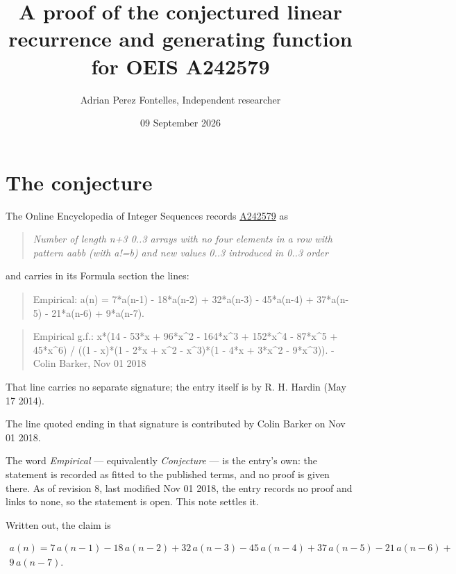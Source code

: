 \documentclass[11pt]{article}
\title{A proof of the conjectured linear recurrence and generating function for OEIS A242579}
\author{Adrian Perez Fontelles, Independent researcher}
\date{09 September 2026}
\theoremstyle{definition}
\begin{document}
\maketitle
\section{The conjecture}

The Online Encyclopedia of Integer Sequences records \href{https://oeis.org/A242579}{A242579} as

\begin{quote}\itshape Number of length n+3 0..3 arrays with no four elements in a row with pattern aabb (with a!=b) and new values 0..3 introduced in 0..3 order\end{quote}

and carries in its Formula section the lines:

\begin{quote}\ttfamily Empirical: a(n) = 7*a(n-1) - 18*a(n-2) + 32*a(n-3) - 45*a(n-4) + 37*a(n-5) - 21*a(n-6) + 9*a(n-7).\end{quote}

\begin{quote}\ttfamily Empirical g.f.: x*(14 - 53*x + 96*x\textasciicircum{}2 - 164*x\textasciicircum{}3 + 152*x\textasciicircum{}4 - 87*x\textasciicircum{}5 + 45*x\textasciicircum{}6) / ((1 - x)*(1 - 2*x + x\textasciicircum{}2 - x\textasciicircum{}3)*(1 - 4*x + 3*x\textasciicircum{}2 - 9*x\textasciicircum{}3)). - Colin Barker, Nov 01 2018\end{quote}

That line carries no separate signature; the entry itself is by R. H. Hardin (May 17 2014).

The line quoted ending in that signature is contributed by Colin Barker on Nov 01 2018.

The word {\itshape Empirical} --- equivalently {\itshape Conjecture} --- is the entry's own: the statement is recorded as fitted to the published terms, and no proof is given there. As of revision 8, last modified Nov 01 2018, the entry records no proof and links to none, so the statement is open. This note settles it.

Written out, the claim is

\begin{multline*} a(n) = 7\,a(n-1) - 18\,a(n-2) + 32\,a(n-3) - 45\,a(n-4) + 37\,a(n-5) - 21\,a(n-6) + \\ 9\,a(n-7). \end{multline*}
\end{document}
